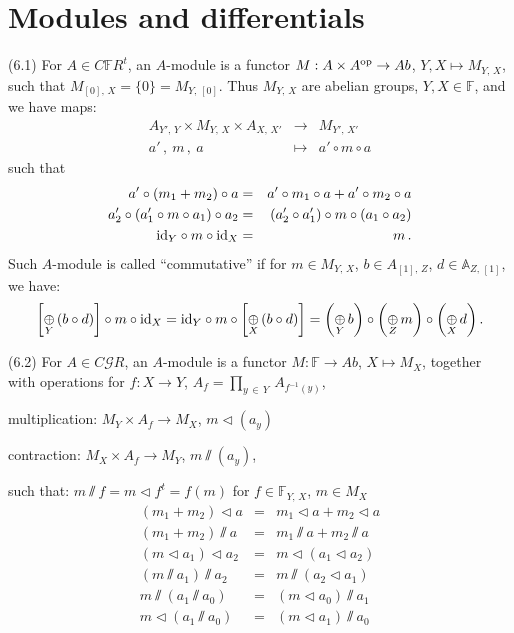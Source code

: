 \documentclass[leqno]{article}
\numberwithin{equation}{section}
\begin{document}
\section{Modules and differentials}

\noindent (6.1)  For $A \in C{\mathbb F} R^t$, an $A$-module is a functor $M : A \times A^{\rm op} \to Ab$, $Y,X \mapsto M_{Y , \, X}$, such that $M_{[0], \, X} = \{0\} = M_{Y, \, [0]}$. Thus $M_{Y, \, X}$ are abelian groups, $Y,X \in {\mathbb F}$, and we have maps:
\begin{eqnarray}
A_{Y' , \, Y} \times M_{Y , \, X} \times A_{X, \, X'} &\to &M_{Y' , \, X'} \nonumber \\
a' \, , \ m \, , \ a &\mapsto &a' \circ m \circ a \nonumber
\end{eqnarray}
such that
\begin{eqnarray}
a' \circ (m_1 + m_2) \circ a &= &a' \circ m_1 \circ a + a' \circ m_2 \circ a \nonumber \\
a'_2 \circ (a'_1 \circ m \circ a_1) \circ a_2 &= &(a'_2 \circ a'_1) \circ m \circ (a_1 \circ a_2) \nonumber \\
{\rm id}_Y \circ m \circ {\rm id}_X&= &m \, . \nonumber
\end{eqnarray}
Such $A$-module is called ``commutative'' if for $m \in M_{Y, \, X}$, $b \in A_{[1] , \, Z}$, $d \in {\mathbb A}_{Z, \, [1]}$, we have:
$$
\left[ \underset{Y}{\oplus} \, (b \circ d) \right] \circ m \circ {\rm id}_X = {\rm id}_Y \circ m \circ \left[ \underset{X}{\oplus} \, (b \circ d) \right] = \left( \underset{Y}{\oplus} \, b \right) \circ \left( \underset{Z}{\oplus} \, m \right) \circ \left( \underset{X}{\oplus} \, d \right) .
$$

\bigskip

\noindent (6.2)  For $A \in C{\mathcal G} R$, an $A$-module is a functor $M : {\mathbb F} \to Ab$, $X \mapsto M_X$, together with operations for $f : X \to Y$, $A_f = \underset{y \, \in \, Y}{\prod} \, A_{f^{-1} (y)}$,

\medskip

multiplication: $M_Y \times A_f \to M_X$, $m \lhd (a_y)$

\medskip

contraction: $M_X \times A_f \to M_Y$, $m \sslash (a_y)$,

\medskip

\noindent such that: $m \sslash f = m \lhd f^t = f(m)$ for $f \in {\mathbb F}_{Y, \, X}$, $m \in M_X$
\begin{eqnarray}
(m_1 + m_2) \lhd a &= &m_1 \lhd a + m_2 \lhd a \nonumber \\
(m_1 + m_2) \sslash a &= &m_1 \sslash a + m_2 \sslash a \nonumber \\
(m \lhd a_1) \lhd a_2 &= &m \lhd (a_1 \lhd a_2) \nonumber \\
(m \sslash a_1) \sslash a_2 &= &m \sslash (a_2 \lhd a_1) \nonumber \\
m \sslash (a_1 \sslash a_0) &= &(m \lhd a_0) \sslash a_1 \nonumber \\
m \lhd (a_1 \sslash a_0) &= &(m \lhd a_1) \sslash a_0 \nonumber 
\end{eqnarray}
\end{document}
